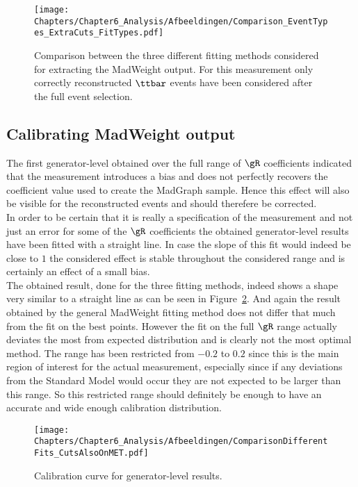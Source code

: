 \begin{figure}[h!t]
 \centering
 \texttt{[image: Chapters/Chapter6\_Analysis/Afbeeldingen/Comparison\_EventTypes\_ExtraCuts\_FitTypes.pdf]}
 \caption{Comparison between the three different fitting methods considered for extracting the MadWeight output. For this measurement only correctly reconstructed $\ttbar$ events have been considered after the full event selection.} \label{fig::FitComp}
\end{figure}

\subsection{Calibrating MadWeight output}
The first generator-level obtained over the full range of $\gR$ coefficients indicated that the measurement introduces a bias and does not perfectly recovers the coefficient value used to create the MadGraph sample. Hence this effect will also be visible for the reconstructed events and should therefere be corrected.
\\
In order to be certain that it is really a specification of the measurement and not just an error for some of the $\gR$ coefficients the obtained generator-level results have been fitted with a straight line. In case the slope of this fit would indeed be close to $1$ the considered effect is stable throughout the considered range and is certainly an effect of a small bias.
\\

The obtained result, done for the three fitting methods, indeed shows a shape very similar to a straight line as can be seen in Figure~\ref{fig::CalibCurve}. And again the result obtained by the general MadWeight fitting method does not differ that much from the fit on the best points. However the fit on the full $\gR$ range actually deviates the most from expected distribution and is clearly not the most optimal method. The range has been restricted from $-0.2$ to $0.2$ since this is the main region of interest for the actual measurement, especially since if any deviations from the Standard Model would occur they are not expected to be larger than this range. So this restricted range should definitely be enough to have an accurate and wide enough calibration distribution.

\begin{figure}[h!t]
 \centering
 \texttt{[image: Chapters/Chapter6\_Analysis/Afbeeldingen/ComparisonDifferentFits\_CutsAlsoOnMET.pdf]}
 \caption{Calibration curve for generator-level results.} \label{fig::CalibCurve}
\end{figure}

